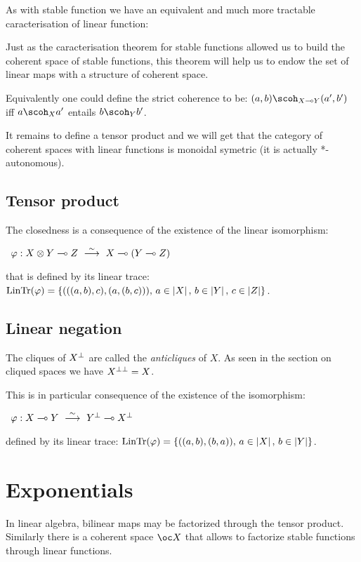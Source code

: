As with stable function we have an equivalent and much more tractable
caracterisation of linear function:

Just as the caracterisation theorem for stable functions allowed us to
build the coherent space of stable functions, this theorem will help us
to endow the set of linear maps with a structure of coherent space.

Equivalently one could define the strict coherence to be:
\((a,b)\scoh_{X\limp Y}(a',b')\) iff \(a\scoh_X a'\) entails
\(b\scoh_Y b'\).

It remains to define a tensor product and we will get that the category
of coherent spaces with linear functions is monoidal symetric (it is
actually *-autonomous).

\subsection{Tensor product}\label{tensor-product}

The closedness is a consequence of the existence of the linear
isomorphism:

\texttt{~}\(\varphi:X\tens Y\limp Z\ \stackrel{\sim}{\longrightarrow}\ X\limp(Y\limp Z)\)

that is defined by its linear trace:
\(\mathrm{LinTr}(\varphi) = \{(((a, b), c), (a, (b, c))),\, a\in\left|X\right|,\, b\in \left|Y\right|,\, c\in\left|Z\right|\}\).

\subsection{Linear negation}\label{linear-negation}

The cliques of \(X^\bot\) are called the \emph{anticliques} of \(X\). As
seen in the section on cliqued spaces we have \(X^{\bot\bot}=X\).

This is in particular consequence of the existence of the isomorphism:

\texttt{~}\(\varphi:X\limp Y\ \stackrel{\sim}{\longrightarrow}\ Y\orth\limp X\orth\)

defined by its linear trace:
\(\mathrm{LinTr}(\varphi) = \{((a, b), (b, a)),\, a\in\left|X\right|,\, b\in\left|Y\right|\}\).

\section{Exponentials}\label{exponentials}

In linear algebra, bilinear maps may be factorized through the tensor
product. Similarly there is a coherent space \(\oc X\) that allows to
factorize stable functions through linear functions.

